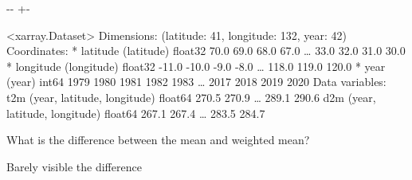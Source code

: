 \documentclass[letterpaper,10pt,english]{sphinxmanual}
\newlength\nbsphinxcodecellspacing
\begin{document}
{

\kern-\sphinxverbatimsmallskipamount\kern-\baselineskip
\kern+\FrameHeightAdjust\kern-\fboxrule
\vspace{\nbsphinxcodecellspacing}

\begin{sphinxVerbatim}[commandchars=\\\{\}]
\llap{\color{nbsphinxout}[33]:\,\hspace{\fboxrule}\hspace{\fboxsep}}<xarray.Dataset>
Dimensions:    (latitude: 41, longitude: 132, year: 42)
Coordinates:
  * latitude   (latitude) float32 70.0 69.0 68.0 67.0 {\ldots} 33.0 32.0 31.0 30.0
  * longitude  (longitude) float32 -11.0 -10.0 -9.0 -8.0 {\ldots} 118.0 119.0 120.0
  * year       (year) int64 1979 1980 1981 1982 1983 {\ldots} 2017 2018 2019 2020
Data variables:
    t2m        (year, latitude, longitude) float64 270.5 270.9 {\ldots} 289.1 290.6
    d2m        (year, latitude, longitude) float64 267.1 267.4 {\ldots} 283.5 284.7
\end{sphinxVerbatim}
}

What is the difference between the mean and weighted mean?

Barely visible the difference

{
\begin{sphinxVerbatim}[commandchars=\\\{\}]
\llap{\color{nbsphinxin}[34]:\,\hspace{\fboxrule}\hspace{\fboxsep}}\PYG{p}{[}\PYG{p}{]}\PYG{p}{[} \PYG{p}{]}
\PYG{p}{[}\PYG{p}{]}\PYG{p}{[}\PYG{p}{]}
\end{sphinxVerbatim}
}
\end{document}
